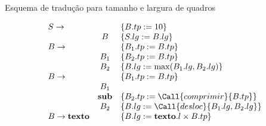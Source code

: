 \begin{frame}[fragile]{Esquema de tradução para tamanho e largura de quadros}

\[
    \begin{array}{lcl}
        S\to & & \{ B.tp := 10 \} \\
        & B & \{ S.lg := B.lg \} \\
        B\to & & \{ B_1.tp := B.tp \} \\
        & B_1 & \{ B_2.tp := B.tp \} \\
        & B_2 & \{ B.lg := \max(B_1.lg, B_2.lg) \} \\
        B\to & & \{ B_1.tp := B.tp \} \\
        & B_1 & \\
        & \textbf{sub} & \{ B_2.tp := \Call{comprimir}{B.tp} \} \\
        & B_2 & \{ B.lg := \Call{desloc}{B_1.lg, B_2.lg} \} \\
        B\to \textbf{texto} & & \{ B.lg := \textbf{texto}.l \times B.tp \} \\
    \end{array}
\]

\end{frame}
